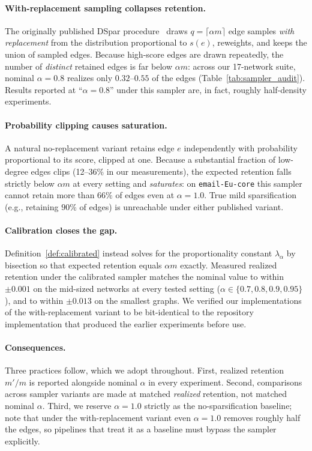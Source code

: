 \documentclass[10pt,journal,compsoc]{IEEEtran}
\begin{document}
\paragraph{With-replacement sampling collapses retention.}
The originally published DSpar procedure~\cite{liu2023dspar} draws $q = \lceil \alpha m \rceil$ edge samples \emph{with replacement} from the distribution proportional to $s(e)$, reweights, and keeps the union of sampled edges.
Because high-score edges are drawn repeatedly, the number of \emph{distinct} retained edges is far below $\alpha m$: across our 17-network suite, nominal $\alpha = 0.8$ realizes only $0.32$--$0.55$ of the edges (Table~\ref{tab:sampler_audit}).
Results reported at ``$\alpha = 0.8$'' under this sampler are, in fact, roughly half-density experiments.

\paragraph{Probability clipping causes saturation.}
A natural no-replacement variant retains edge $e$ independently with probability proportional to its score, clipped at one.
Because a substantial fraction of low-degree edges clips (12--36\% in our measurements), the expected retention falls strictly below $\alpha m$ at every setting and \emph{saturates}: on \texttt{email-Eu-core} this sampler cannot retain more than $66\%$ of edges even at $\alpha = 1.0$.
True mild sparsification (e.g., retaining $90\%$ of edges) is unreachable under either published variant.

\paragraph{Calibration closes the gap.}
Definition~\ref{def:calibrated} instead solves for the proportionality constant $\lambda_\alpha$ by bisection so that expected retention equals $\alpha m$ exactly.
Measured realized retention under the calibrated sampler matches the nominal value to within $\pm 0.001$ on the mid-sized networks at every tested setting ($\alpha \in \{0.7, 0.8, 0.9, 0.95\}$), and to within $\pm 0.013$ on the smallest graphs.
We verified our implementations of the with-replacement variant to be bit-identical to the repository implementation that produced the earlier experiments before use.



\paragraph{Consequences.}
Three practices follow, which we adopt throughout.
First, realized retention $m'/m$ is reported alongside nominal $\alpha$ in every experiment.
Second, comparisons across sampler variants are made at matched \emph{realized} retention, not matched nominal $\alpha$.
Third, we reserve $\alpha = 1.0$ strictly as the no-sparsification baseline; note that under the with-replacement variant even $\alpha = 1.0$ removes roughly half the edges, so pipelines that treat it as a baseline must bypass the sampler explicitly.
\end{document}
